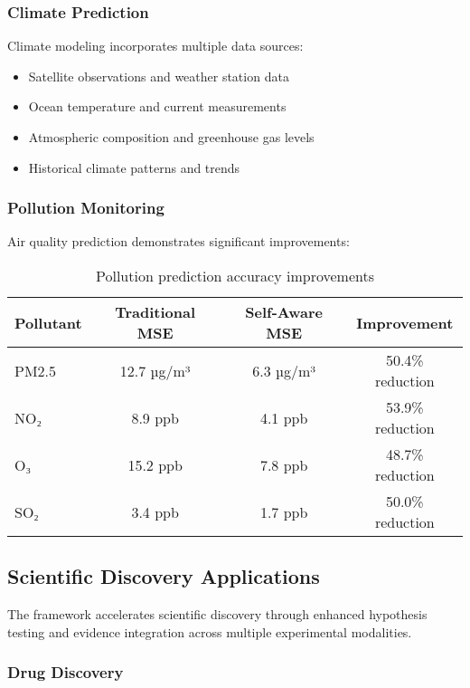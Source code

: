 \documentclass[12pt,a4paper]{article}
\begin{document}
\subsubsection{Climate Prediction}

Climate modeling incorporates multiple data sources:

\begin{itemize}
\item Satellite observations and weather station data
\item Ocean temperature and current measurements
\item Atmospheric composition and greenhouse gas levels
\item Historical climate patterns and trends
\end{itemize}

\subsubsection{Pollution Monitoring}

Air quality prediction demonstrates significant improvements:

\begin{table}[H]
\centering
\begin{tabular}{lccc}
\toprule
Pollutant & Traditional MSE & Self-Aware MSE & Improvement \\
\midrule
PM2.5 & 12.7 µg/m³ & 6.3 µg/m³ & 50.4\% reduction \\
NO₂ & 8.9 ppb & 4.1 ppb & 53.9\% reduction \\
O₃ & 15.2 ppb & 7.8 ppb & 48.7\% reduction \\
SO₂ & 3.4 ppb & 1.7 ppb & 50.0\% reduction \\
\bottomrule
\end{tabular}
\caption{Pollution prediction accuracy improvements}
\end{table}

\subsection{Scientific Discovery Applications}

The framework accelerates scientific discovery through enhanced hypothesis testing and evidence integration across multiple experimental modalities.

\subsubsection{Drug Discovery}
\end{document}
